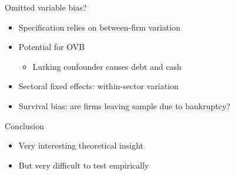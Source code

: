 \documentclass[ignorenonframetext,aspectratio=169]{beamer}
\providecommand{\tightlist}{%
  \setlength{\itemsep}{0pt}\setlength{\parskip}{0pt}}
\begin{document}
\begin{frame}{Omitted variable bias?}

\begin{itemize}
\item
  Specification relies on between-firm variation
\item
  Potential for OVB

  \begin{itemize}
  \tightlist
  \item
    Lurking confounder causes debt and cash
  \end{itemize}
\item
  Sectoral fixed effects: within-sector variation
\item
  Survival bias: are firms leaving sample due to bankruptcy?
\end{itemize}

\end{frame}

\begin{frame}{Conclusion}

\begin{itemize}
\item
  Very interesting theoretical insight
\item
  But very difficult to test empirically
\end{itemize}

\end{frame}
\end{document}
